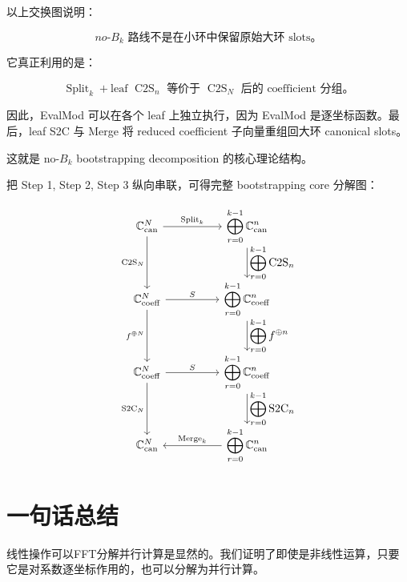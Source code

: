 \documentclass[UTF8,11pt]{ctexart}
\theoremstyle{definition}
\newcommand{\CtwoS}{\operatorname{C2S}}
\newcommand{\StwoC}{\operatorname{S2C}}
\newcommand{\Split}{\operatorname{Split}}
\newcommand{\Merge}{\operatorname{Merge}}
\begin{document}
以上交换图说明：

\[
\boxed{
no\text{-}B_k \text{ 路线不是在小环中保留原始大环 slots。}
}
\]

它真正利用的是：

\[
\boxed{
\Split_k+\text{leaf }\CtwoS_n
\text{ 等价于 }
\CtwoS_N
\text{ 后的 coefficient 分组。}
}
\]

因此，EvalMod 可以在各个 leaf 上独立执行，因为 EvalMod 是逐坐标函数。最后，leaf S2C 与 Merge 将 reduced coefficient 子向量重组回大环 canonical slots。

这就是 no-\(B_k\) bootstrapping decomposition 的核心理论结构。


把 Step 1, Step 2, Step 3 纵向串联，可得完整 bootstrapping core 分解图：

\[
\begin{tikzcd}[column sep=huge,row sep=large]
\mathbb{C}^{N}_{\mathrm{can}}
    \arrow[r,"\Split_k"]
    \arrow[d,"\CtwoS_N"']
&
\displaystyle\bigoplus_{r=0}^{k-1}\mathbb{C}^{n}_{\mathrm{can}}
    \arrow[d,"\displaystyle\bigoplus_{r=0}^{k-1}\CtwoS_n"]
\\
\mathbb{C}^{N}_{\mathrm{coeff}}
    \arrow[r,"S"]
    \arrow[d,"f^{\oplus N}"']
&
\displaystyle\bigoplus_{r=0}^{k-1}\mathbb{C}^{n}_{\mathrm{coeff}}
    \arrow[d,"\displaystyle\bigoplus_{r=0}^{k-1}f^{\oplus n}"]
\\
\mathbb{C}^{N}_{\mathrm{coeff}}
    \arrow[r,"S"]
    \arrow[d,"\StwoC_N"']
&
\displaystyle\bigoplus_{r=0}^{k-1}\mathbb{C}^{n}_{\mathrm{coeff}}
    \arrow[d,"\displaystyle\bigoplus_{r=0}^{k-1}\StwoC_n"]
\\
\mathbb{C}^{N}_{\mathrm{can}}
&
\displaystyle\bigoplus_{r=0}^{k-1}\mathbb{C}^{n}_{\mathrm{can}}
    \arrow[l,"\Merge_k"']
\end{tikzcd}
\]

\section{一句话总结}

线性操作可以FFT分解并行计算是显然的。我们证明了即使是非线性运算，只要它是对系数逐坐标作用的，也可以分解为并行计算。
\end{document}
